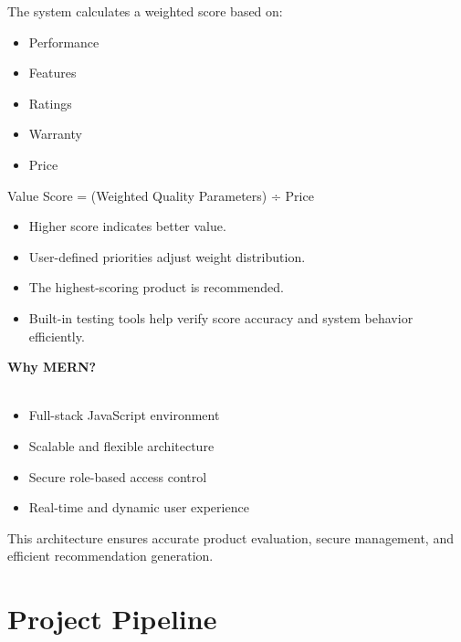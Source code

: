 \begin{enumerate}
         The system calculates a weighted score based on:
 \begin{itemize}
\item Performance
\item Features
\item Ratings
\item Warranty
\item Price
\end{itemize}
Value Score = (Weighted Quality Parameters) ÷ Price
\begin{itemize}
\item Higher score indicates better value.
\item User-defined priorities adjust weight distribution.
\item The highest-scoring product is recommended.
        \item Built-in testing tools help verify score accuracy and system behavior efficiently.
    \end{itemize}
\end{enumerate}
\textbf{Why MERN?}\\\\
\begin{itemize}
\item Full-stack JavaScript environment
\item Scalable and flexible architecture
\item Secure role-based access control
\item Real-time and dynamic user experience
\end{itemize}
This architecture ensures accurate product evaluation, secure management, and efficient recommendation generation.
\section{Project Pipeline}

